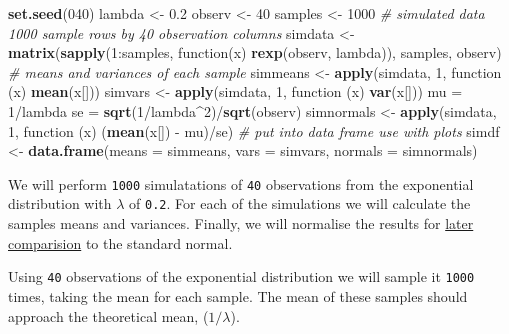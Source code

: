 \documentclass[legalpaper]{article}
\newenvironment{Shaded}{\begin{snugshade}}{\end{snugshade}}
\newcommand{\KeywordTok}[1]{\textcolor[rgb]{0.13,0.29,0.53}{\textbf{{#1}}}}
\newcommand{\DataTypeTok}[1]{\textcolor[rgb]{0.13,0.29,0.53}{{#1}}}
\newcommand{\DecValTok}[1]{\textcolor[rgb]{0.00,0.00,0.81}{{#1}}}
\newcommand{\FloatTok}[1]{\textcolor[rgb]{0.00,0.00,0.81}{{#1}}}
\newcommand{\StringTok}[1]{\textcolor[rgb]{0.31,0.60,0.02}{{#1}}}
\newcommand{\CommentTok}[1]{\textcolor[rgb]{0.56,0.35,0.01}{\textit{{#1}}}}
\newcommand{\NormalTok}[1]{{#1}}
\begin{document}
\begin{Shaded}
\begin{Highlighting}[]
\KeywordTok{set.seed}\NormalTok{(}\DecValTok{040}\NormalTok{)}
\NormalTok{lambda <-}\StringTok{ }\FloatTok{0.2}
\NormalTok{observ <-}\StringTok{ }\DecValTok{40}
\NormalTok{samples <-}\StringTok{ }\DecValTok{1000}
\CommentTok{# simulated data 1000 sample rows by 40 observation columns}
\NormalTok{simdata <-}\StringTok{ }\KeywordTok{matrix}\NormalTok{(}\KeywordTok{sapply}\NormalTok{(}\DecValTok{1}\NormalTok{:samples, function(x) }\KeywordTok{rexp}\NormalTok{(observ, lambda)), samples, observ)}
\CommentTok{# means and variances of each sample}
\NormalTok{simmeans <-}\StringTok{ }\KeywordTok{apply}\NormalTok{(simdata, }\DecValTok{1}\NormalTok{, function (x) }\KeywordTok{mean}\NormalTok{(x[]))}
\NormalTok{simvars <-}\StringTok{ }\KeywordTok{apply}\NormalTok{(simdata, }\DecValTok{1}\NormalTok{, function (x) }\KeywordTok{var}\NormalTok{(x[]))}
\NormalTok{mu =}\StringTok{ }\DecValTok{1}\NormalTok{/lambda}
\NormalTok{se =}\StringTok{ }\KeywordTok{sqrt}\NormalTok{(}\DecValTok{1}\NormalTok{/lambda^}\DecValTok{2}\NormalTok{)/}\KeywordTok{sqrt}\NormalTok{(observ)}
\NormalTok{simnormals <-}\StringTok{ }\KeywordTok{apply}\NormalTok{(simdata, }\DecValTok{1}\NormalTok{, function (x) (}\KeywordTok{mean}\NormalTok{(x[]) -}\StringTok{ }\NormalTok{mu)/se)}
\CommentTok{# put into data frame use with plots}
\NormalTok{simdf <-}\StringTok{ }\KeywordTok{data.frame}\NormalTok{(}\DataTypeTok{means =} \NormalTok{simmeans, }\DataTypeTok{vars =} \NormalTok{simvars, }\DataTypeTok{normals =} \NormalTok{simnormals)}
\end{Highlighting}
\end{Shaded}

We will perform \texttt{1000} simulatations of \texttt{40} observations
from the exponential distribution with \(\lambda\) of \texttt{0.2}. For
each of the simulations we will calculate the samples means and
variances. Finally, we will normalise the results for
\hyperref[distribution-is-approximately-normal]{later comparision} to
the standard normal.


Using \texttt{40} observations of the exponential distribution we will
sample it \texttt{1000} times, taking the mean for each sample. The mean
of these samples should approach the theoretical mean, (\(1/\lambda\)).
\end{document}
